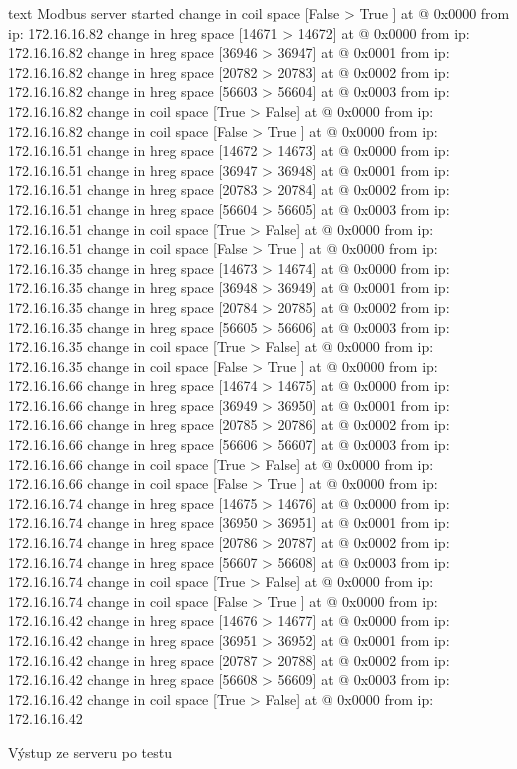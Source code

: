 \begin{listing}[htbp]
    \centering
    \begin{cminted}[breaklines,autogobble, fontsize=\footnotesize]{text}
Modbus server started
change in coil space [False > True ] at @ 0x0000 from ip: 172.16.16.82   
change in hreg space [14671 > 14672] at @ 0x0000 from ip: 172.16.16.82   
change in hreg space [36946 > 36947] at @ 0x0001 from ip: 172.16.16.82   
change in hreg space [20782 > 20783] at @ 0x0002 from ip: 172.16.16.82   
change in hreg space [56603 > 56604] at @ 0x0003 from ip: 172.16.16.82   
change in coil space [True  > False] at @ 0x0000 from ip: 172.16.16.82   
change in coil space [False > True ] at @ 0x0000 from ip: 172.16.16.51   
change in hreg space [14672 > 14673] at @ 0x0000 from ip: 172.16.16.51   
change in hreg space [36947 > 36948] at @ 0x0001 from ip: 172.16.16.51   
change in hreg space [20783 > 20784] at @ 0x0002 from ip: 172.16.16.51   
change in hreg space [56604 > 56605] at @ 0x0003 from ip: 172.16.16.51   
change in coil space [True  > False] at @ 0x0000 from ip: 172.16.16.51   
change in coil space [False > True ] at @ 0x0000 from ip: 172.16.16.35   
change in hreg space [14673 > 14674] at @ 0x0000 from ip: 172.16.16.35   
change in hreg space [36948 > 36949] at @ 0x0001 from ip: 172.16.16.35   
change in hreg space [20784 > 20785] at @ 0x0002 from ip: 172.16.16.35   
change in hreg space [56605 > 56606] at @ 0x0003 from ip: 172.16.16.35   
change in coil space [True  > False] at @ 0x0000 from ip: 172.16.16.35   
change in coil space [False > True ] at @ 0x0000 from ip: 172.16.16.66   
change in hreg space [14674 > 14675] at @ 0x0000 from ip: 172.16.16.66   
change in hreg space [36949 > 36950] at @ 0x0001 from ip: 172.16.16.66   
change in hreg space [20785 > 20786] at @ 0x0002 from ip: 172.16.16.66   
change in hreg space [56606 > 56607] at @ 0x0003 from ip: 172.16.16.66   
change in coil space [True  > False] at @ 0x0000 from ip: 172.16.16.66   
change in coil space [False > True ] at @ 0x0000 from ip: 172.16.16.74   
change in hreg space [14675 > 14676] at @ 0x0000 from ip: 172.16.16.74   
change in hreg space [36950 > 36951] at @ 0x0001 from ip: 172.16.16.74   
change in hreg space [20786 > 20787] at @ 0x0002 from ip: 172.16.16.74   
change in hreg space [56607 > 56608] at @ 0x0003 from ip: 172.16.16.74   
change in coil space [True  > False] at @ 0x0000 from ip: 172.16.16.74   
change in coil space [False > True ] at @ 0x0000 from ip: 172.16.16.42   
change in hreg space [14676 > 14677] at @ 0x0000 from ip: 172.16.16.42   
change in hreg space [36951 > 36952] at @ 0x0001 from ip: 172.16.16.42   
change in hreg space [20787 > 20788] at @ 0x0002 from ip: 172.16.16.42   
change in hreg space [56608 > 56609] at @ 0x0003 from ip: 172.16.16.42   
change in coil space [True  > False] at @ 0x0000 from ip: 172.16.16.42   
    \end{cminted}
\caption{Výstup ze serveru po testu}
\label{listing:modbus_server_log}
\end{listing}